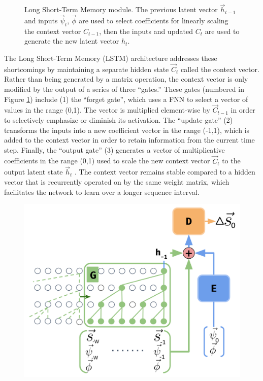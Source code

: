 \documentclass[11pt]{article}
\begin{document}
\begin{multicols}{2}
\begin{figure}[H]
        \caption{Long Short-Term Memory module. The previous latent vector $\vec{h}_{t-1}$ and inputs $\vec{\psi}_t$, $\vec{\phi}$ are used to select coefficients for linearly scaling the context vector $C_{t-1}$, then the inputs and updated $C_t$ are used to generate the new latent vector $h_t$.}
        \label{lstm}
    \end{figure}

    The Long Short-Term Memory (LSTM) architecture addresses these shortcomings by maintaining a separate hidden state $\vec{C}_t$ called the context vector. Rather than being generated by a matrix operation, the context vector is only modified by the output of a series of three ``gates.'' These gates (numbered in Figure \ref{lstm})  include (1) the ``forget gate'', which uses a FNN to select a vector of values in the range (0,1). The vector is multiplied element-wise by $\vec{C}_{t-1}$ in order to selectively emphasize or diminish its activation. The ``update gate'' (2) transforms the inputs into a new coefficient vector in the range (-1,1), which is added to the context vector in order to retain information from the current time step. Finally, the ``output gate'' (3) generates a vector of multiplicative coefficients in the range (0,1) used to scale the new context vector $\vec{C}_t$ to the output latent state $\vec{h}_t$ \cite{hochreiter_long_1997}. The context vector remains stable compared to a hidden vector that is recurrently operated on by the same weight matrix, which facilitates the network to learn over a longer sequence interval.

    \begin{figure}[H]
        \centering

        \includegraphics[width=.95\linewidth]{figs/deeptcn.png}


\end{figure}
\end{multicols}
\end{document}
